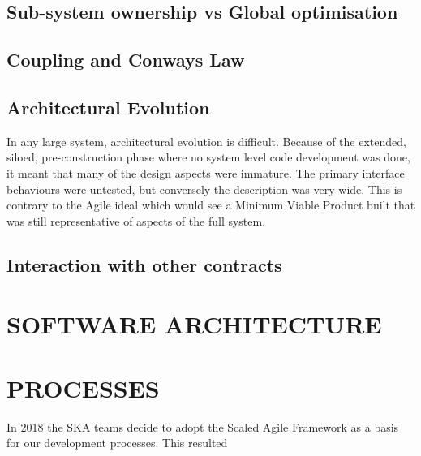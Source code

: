 \documentclass[a4paper,
               biblatex,     %
               keeplastbox,   %
               ]{jacow}
\begin{document}
\subsection{Sub-system ownership vs Global optimisation}
\subsection{Coupling and Conways Law}
\subsection{Architectural Evolution}
In any large system, architectural evolution is difficult. Because of the extended, siloed, pre-construction phase where no system level code development was done, it meant that many of the design aspects were immature. The primary interface behaviours were untested, but conversely the description was very wide. This is contrary to the Agile ideal which would see a Minimum Viable Product built that was still representative of aspects of the full system. 

\subsection{Interaction with other contracts}

\section{SOFTWARE ARCHITECTURE}


\section{PROCESSES}
In 2018 the SKA teams decide to adopt the Scaled Agile Framework as a basis for our development processes. This resulted 

\end{document}
